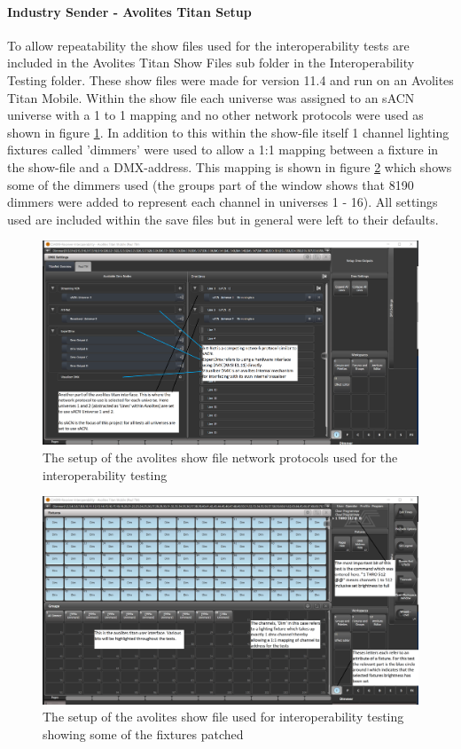 \documentclass[11pt,a4paper]{article}
\begin{document}
\paragraph*{Industry Sender - Avolites Titan Setup}
To allow repeatability the show files used for the interoperability tests are included in the Avolites Titan Show Files sub folder in the Interoperability Testing folder. These show files were made for version 11.4 and run on an Avolites Titan Mobile. Within the show file each universe was assigned to an sACN universe with a 1 to 1 mapping and no other network protocols were used as shown in figure \ref{AVO_DMX_LINES}.  In addition to this within the show-file itself 1 channel lighting fixtures called 'dimmers' were used to allow a 1:1 mapping between a fixture in the show-file and a DMX-address. This mapping is shown in figure \ref{AVO_RECV_INTEROP_SETUP} which shows some of the dimmers used (the groups part of the window shows that 8190 dimmers were added to represent each channel in universes 1 - 16). All settings used are included within the save files but in general were left to their defaults.

\begin{figure}[H]
	\label{AVO_DMX_LINES}
	\includegraphics*[width=\textwidth]{avo-dmx-lines.png}
	\caption{The setup of the avolites show file network protocols used for the interoperability testing}
\end{figure}

\begin{figure}[H]
	\label{AVO_RECV_INTEROP_SETUP}
	\includegraphics*[width=\textwidth]{avo-file-dims.png}
	\caption{The setup of the avolites show file used for interoperability testing showing some of the fixtures patched}
\end{figure}
\end{document}
